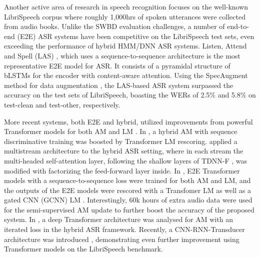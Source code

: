 \documentclass[a4paper]{article}
\begin{document}
Another active area of research in speech recognition focuses on the well-known LibriSpeech corpus \cite{panayotov2015librispeech} where roughly 1,000hrs of spoken utterances were collected from audio books. Unlike the SWBD evaluation challenges, a number of end-to-end (E2E) ASR systems have been competitive on the LibriSpeech test sets, even exceeding the performance of hybrid HMM/DNN ASR systems. Listen, Attend and Spell (LAS) \cite{chan}, which uses a sequence-to-sequence architecture is the most representative E2E model for ASR. It consists of a pyramidal structure of bLSTMs for the encoder with content-aware attention. Using the SpecAugment method for data augmentation \cite{specaugment}, the LAS-based ASR system surpassed the accuracy on the test sets of LibriSpeech, boasting the WERs of 2.5\% and 5.8\% on test-clean and test-other, respectively.

More recent systems, both E2E and hybrid, utilized improvements from powerful Transformer models \cite{vaswani} for both AM and LM \cite{Luscher2019,han19-2,synnaeve19,wang20}. In \cite{Luscher2019}, a hybrid AM with sequence discriminative training was boosted by Transformer LM rescoring. \cite{han19-2} applied a multistream architecture to the hybrid ASR setting, where in each stream the multi-headed self-attention layer, following the shallow layers of TDNN-F \cite{povey18tdnnf}, was modified with factorizing the feed-forward layer inside. In \cite{synnaeve19}, E2E Transformer models with a sequence-to-sequence loss were trained for both AM and LM, and the outputs of the E2E models were rescored with a Transfomer LM as well as a gated CNN (GCNN) LM \cite{dauphin17}. Interestingly, 60k hours of extra audio data \cite{librilight,librivox14} were used for the semi-supervised AM update to further boost the accuracy of the proposed system. In \cite{wang20}, a deep Transformer architecture was analysed for AM with an iterated loss \cite{Tjandra20} in the hybrid ASR framework. Recently, a CNN-RNN-Transducer architecture was introduced \cite{han2020contextnet}, demonstrating even further improvement using Transformer models on the LibriSpeech benchmark. 
\end{document}
